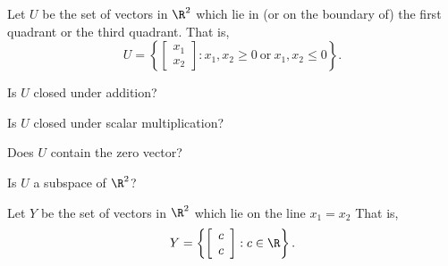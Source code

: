 \endedxproblem



Let $U$ be the set of vectors in $\R^2$ which lie in (or on the boundary of) the first quadrant or
the third quadrant.  
That is,
\[ U = \left\{ \left[ \begin{array}{c} x_1 \\ x_2 \end{array} \right] : x_1, x_2 \ge 0 \ \mathrm{or} \ x_1,x_2 \le 0\right\}. \]

\begin{center}
   
\end{center}

Is $U$ closed under addition?


Is $U$ closed under scalar multiplication?


Does $U$ contain the zero vector?


Is $U$ a subspace of $\R^2$?  



 
\endedxproblem



Let $Y$ be the set of vectors in $\R^2$ which lie on the line $x_1 = x_2$
That is,
\[ Y = \left\{ \left[ \begin{array}{c} c \\ c \end{array} \right] : c \in \R \right\}. \]

\begin{center}
   
\end{center}

